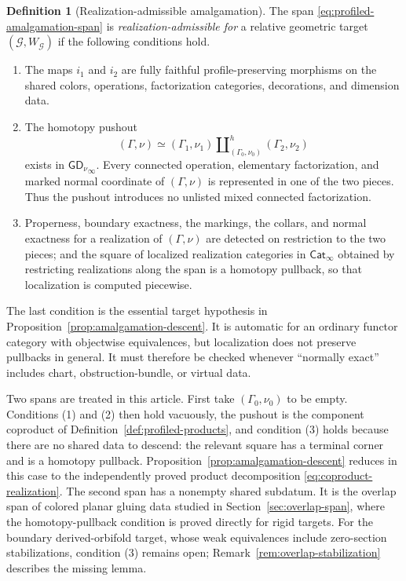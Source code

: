 \documentclass[11pt,letterpaper,twoside]{article}
\theoremstyle{plain}
\theoremstyle{definition}
\newtheorem{definition}[theorem]{Definition}
\theoremstyle{remark}
\newcommand{\LGrm}{\mathsf{GD}_{\nu}}
\begin{document}
\begin{definition}[Realization-admissible amalgamation]\label{def:realization-admissible-amalgamation}
The span \eqref{eq:profiled-amalgamation-span} is \emph{realization-admissible for} a relative geometric target $(\mathcal G,W_{\mathcal G})$ if the following conditions hold.
\begin{enumerate}
\item The maps $i_1$ and $i_2$ are fully faithful profile-preserving morphisms on the shared colors, operations, factorization categories, decorations, and dimension data.
\item The homotopy pushout
\begin{equation}\label{eq:grammar-homotopy-pushout}
 (\Gamma,\nu)
 \simeq
 (\Gamma_1,\nu_1)
 \amalg^{h}_{(\Gamma_0,\nu_0)}
 (\Gamma_2,\nu_2)
\end{equation}
exists in \({\LGrm}_\infty\).  Every connected operation, elementary factorization, and marked normal coordinate of $(\Gamma,\nu)$ is represented in one of the two pieces.  Thus the pushout introduces no unlisted mixed connected factorization.
\item Properness, boundary exactness, the markings, the collars, and normal exactness for a realization of $(\Gamma,\nu)$ are detected on restriction to the two pieces; and the square of localized realization categories in \(\mathsf{Cat}_\infty\) obtained by restricting realizations along the span is a homotopy pullback, so that localization is computed piecewise.
\end{enumerate}
The last condition is the essential target hypothesis in Proposition~\ref{prop:amalgamation-descent}.  It is automatic for an ordinary functor category with objectwise equivalences, but localization does not preserve pullbacks in general.  It must therefore be checked whenever ``normally exact'' includes chart, obstruction-bundle, or virtual data.

Two spans are treated in this article.  First take \((\Gamma_0,\nu_0)\) to be empty.  Conditions (1) and (2) then hold vacuously, the pushout is the component coproduct of Definition~\ref{def:profiled-products}, and condition (3) holds because there are no shared data to descend: the relevant square has a terminal corner and is a homotopy pullback.  Proposition~\ref{prop:amalgamation-descent} reduces in this case to the independently proved product decomposition \eqref{eq:coproduct-realization}.  The second span has a nonempty shared subdatum.  It is the overlap span of colored planar gluing data studied in Section~\ref{sec:overlap-span}, where the homotopy-pullback condition is proved directly for rigid targets.  For the boundary derived-orbifold target, whose weak equivalences include zero-section stabilizations, condition (3) remains open; Remark~\ref{rem:overlap-stabilization} describes the missing lemma.
\end{definition}
\end{document}
